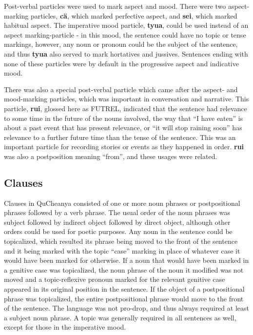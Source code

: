 \documentclass{article}
\begin{document}
Post-verbal particles were used to mark aspect and mood.  There were two aspect-marking particles, \textbf{c\"a}, which marked perfective aspect, and \textbf{sei}, which marked habitual aspect.  The imperative mood particle, \textbf{tyua}, could be used instead of an aspect marking-particle - in this mood, the sentence could have no topic or tense markings, however, any noun or pronoun could be the subject of the sentence, and thus \textbf{tyua} also served to mark hortatives and jussives.  Sentences ending with none of these particles were by default in the progressive aspect and indicative mood.

There was also a special post-verbal particle which came after the aspect- and mood-marking particles, which was important in conversation and narrative.  This particle, \textbf{rui}, glossed here as \textsc{FUTREL}, indicated that the sentence had relevance to some time in the future of the nouns involved, the way that ``I have eaten'' is about a past event that has present relevance, or ``it will stop raining soon'' has relevance to a further future time than the tense of the sentence.  This was an important particle for recording stories or events as they happened in order.  \textbf{rui} was also a postposition meaning ``from'', and these usages were related.

\subsection{Clauses}

Clauses in QuCheanya consisted of one or more noun phrases or postpositional phrases followed by a verb phrase.  The usual order of the noun phrases was subject followed by indirect object followed by direct object, although other orders could be used for poetic purposes.  Any noun in the sentence could be topicalized, which resulted its phrase being moved to the front of the sentence and it being marked with the topic ``case'' marking in place of whatever case it would have been marked for otherwise.  If a noun that would have been marked in a genitive case was topicalized, the noun phrase of the noun it modified was not moved and a topic-reflexive pronoun marked for the relevant genitive case appeared in its original position in the sentence.  If the object of a postpositional phrase was topicalized, the entire postpositional phrase would move to the front of the sentence.  The language was not pro-drop, and thus always required at least a subject noun phrase.  A topic was generally required in all sentences as well, except for those in the imperative mood.
\end{document}
